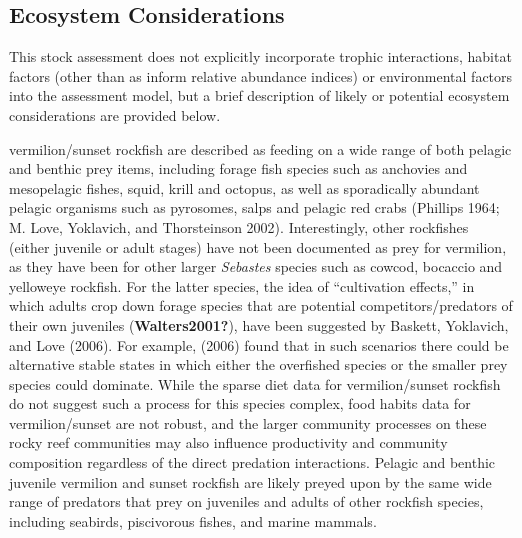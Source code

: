 \documentclass[11pt,
  english,
  a4paper,
]{article}
\begin{document}

\hypertarget{ecosystem-considerations}{%
\subsection{Ecosystem Considerations}\label{ecosystem-considerations}}

\leavevmode\tagmcend\tagstructend

This stock assessment does not explicitly incorporate trophic interactions, habitat factors (other than as inform relative abundance indices) or environmental factors into the assessment model, but a brief description of likely or potential ecosystem considerations are provided below.

vermilion/sunset rockfish are described as feeding on a wide range of both pelagic and benthic prey items, including forage fish species such as anchovies and mesopelagic fishes, squid, krill and octopus, as well as sporadically abundant pelagic organisms such as pyrosomes, salps and pelagic red crabs {(Phillips 1964; M. Love, Yoklavich, and Thorsteinson 2002)\leavevmode\tagmcend\tagstructend}. Interestingly, other rockfishes (either juvenile or adult stages) have not been documented as prey for vermilion, as they have been for other larger \emph{Sebastes} species such as cowcod, bocaccio and yelloweye rockfish. For the latter species, the idea of ``cultivation effects,'' in which adults crop down forage species that are potential competitors/predators of their own juveniles {(\textbf{Walters2001?})\leavevmode\tagmcend\tagstructend}, have been suggested by {Baskett, Yoklavich, and Love (2006)\leavevmode\tagmcend\tagstructend}. For example, {(2006)\leavevmode\tagmcend\tagstructend} found that in such scenarios there could be alternative stable states in which either the overfished species or the smaller prey species could dominate. While the sparse diet data for vermilion/sunset rockfish do not suggest such a process for this species complex, food habits data for vermilion/sunset are not robust, and the larger community processes on these rocky reef communities may also influence productivity and community composition regardless of the direct predation interactions. Pelagic and benthic juvenile vermilion and sunset rockfish are likely preyed upon by the same wide range of predators that prey on juveniles and adults of other rockfish species, including seabirds, piscivorous fishes, and marine mammals.\\
\end{document}

